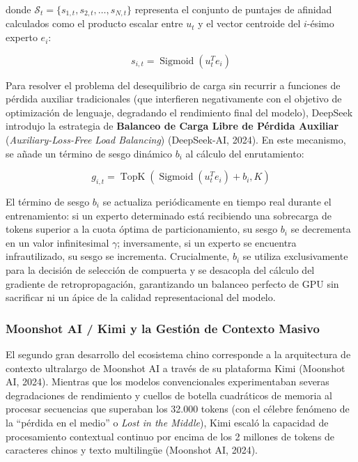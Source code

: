 donde $\mathcal{S}_t = \{s_{1, t}, s_{2, t}, \dots, s_{N, t}\}$ representa el conjunto de puntajes de afinidad calculados como el producto escalar entre $u_t$ y el vector centroide del $i$-ésimo experto $e_i$:

\begin{equation}
    s_{i, t} = \operatorname{Sigmoid}(u_t^T e_i)
    \label{eq:moe_affinity}
\end{equation}

Para resolver el problema del desequilibrio de carga sin recurrir a funciones de pérdida auxiliar tradicionales (que interfieren negativamente con el objetivo de optimización de lenguaje, degradando el rendimiento final del modelo), DeepSeek introdujo la estrategia de \textbf{Balanceo de Carga Libre de Pérdida Auxiliar} (\textit{Auxiliary-Loss-Free Load Balancing}) (DeepSeek-AI, 2024). En este mecanismo, se añade un término de sesgo dinámico $b_i$ al cálculo del enrutamiento:

\begin{equation}
    g_{i, t} = \operatorname{TopK}\left( \operatorname{Sigmoid}(u_t^T e_i) + b_i, K \right)
    \label{eq:aux_loss_free_balance}
\end{equation}

El término de sesgo $b_i$ se actualiza periódicamente en tiempo real durante el entrenamiento: si un experto determinado está recibiendo una sobrecarga de tokens superior a la cuota óptima de particionamiento, su sesgo $b_i$ se decrementa en un valor infinitesimal $\gamma$; inversamente, si un experto se encuentra infrautilizado, su sesgo se incrementa. Crucialmente, $b_i$ se utiliza exclusivamente para la decisión de selección de compuerta y se desacopla del cálculo del gradiente de retropropagación, garantizando un balanceo perfecto de GPU sin sacrificar ni un ápice de la calidad representacional del modelo.


\subsubsection{Moonshot AI / Kimi y la Gestión de Contexto Masivo}

El segundo gran desarrollo del ecosistema chino corresponde a la arquitectura de contexto ultralargo de Moonshot AI a través de su plataforma Kimi (Moonshot AI, 2024). Mientras que los modelos convencionales experimentaban severas degradaciones de rendimiento y cuellos de botella cuadráticos de memoria al procesar secuencias que superaban los 32.000 tokens (con el célebre fenómeno de la ``pérdida en el medio'' o \textit{Lost in the Middle}), Kimi escaló la capacidad de procesamiento contextual continuo por encima de los 2 millones de tokens de caracteres chinos y texto multilingüe (Moonshot AI, 2024).

